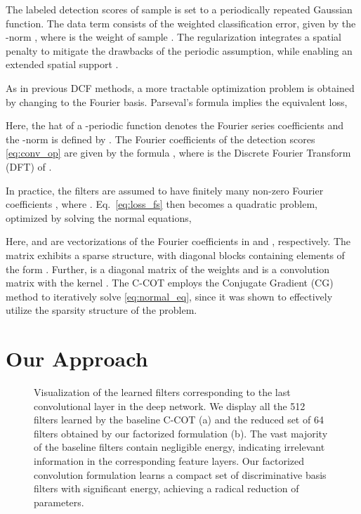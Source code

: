 \documentclass[10pt,twocolumn,letterpaper]{article}
\begin{document}
The labeled detection scores  of sample  is set to a periodically repeated Gaussian function. The data term consists of the weighted classification error, given by the -norm , where  is the weight of sample . The regularization integrates a spatial penalty  to mitigate the drawbacks of the periodic assumption, while enabling an extended spatial support \cite{DanelljanICCV2015}.


As in previous DCF methods, a more tractable optimization problem is obtained by changing to the Fourier basis. Parseval's formula implies the equivalent loss,

Here, the hat  of a -periodic function  denotes the Fourier series coefficients  and the -norm is defined by . The Fourier coefficients of the detection scores \eqref{eq:conv_op} are given by the formula , where  is the Discrete Fourier Transform (DFT) of .

In practice, the filters  are assumed to have finitely many non-zero Fourier coefficients , where .
Eq.~\eqref{eq:loss_fs} then becomes a quadratic problem, optimized by solving the normal equations,

Here,  and  are vectorizations of the Fourier coefficients in  and , respectively. The matrix  exhibits a sparse structure, with diagonal blocks containing elements of the form . Further,  is a diagonal matrix of the weights  and  is a convolution matrix with the kernel . The C-COT \cite{DanelljanECCV2016} employs the Conjugate Gradient (CG) method \cite{NumericalOptimization} to iteratively solve \eqref{eq:normal_eq}, since it was shown to effectively utilize the sparsity structure of the problem.


 
\section{Our Approach}
\label{sec:method}

\begin{figure*}[!t]
	\centering \newcommand{\wid}{4.23cm}\vspace{-3.5mm}\hspace{1mm}
	\caption{Visualization of the learned filters corresponding to the last convolutional layer in the deep network. We display all the 512 filters  learned by the baseline C-COT (a) and the reduced set of 64 filters  obtained by our factorized formulation (b). The vast majority of the baseline filters contain negligible energy, indicating irrelevant information in the corresponding feature layers. Our factorized convolution formulation learns a compact set of discriminative basis filters with significant energy, achieving a radical reduction of parameters.}\vspace{-2mm}\label{fig:filters}
\end{figure*}
\end{document}
